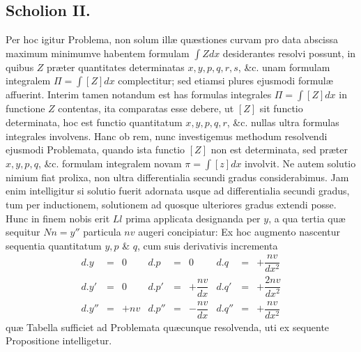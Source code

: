 \subsection*{Scholion II.}
Per hoc igitur Problema, non solum illæ quæstiones curvam pro data abscissa maximum minimumve habentem formulam $\int Zdx$ desiderantes resolvi possunt, in quibus $Z$ præter quantitates determinatas $x,y,p,q,r,s$, \&c. unam formulam integralem $\Pi=\int[Z]dx$ complectitur; sed etiamsi plures ejusmodi formulæ affuerint. Interim tamen notandum est has formulas integrales $\Pi=\int[Z]dx$ in functione $Z$ contentas, ita comparatas esse debere, ut $[Z]$ sit functio determinata, hoc est functio quantitatum $x,y,p,q,r$, \&c. nullas ultra formulas integrales involvens. Hanc ob rem, nunc investigemus methodum resolvendi ejusmodi Problemata, quando ista functio $[Z]$ non est determinata, sed præter $x,y,p,q$, \&c. formulam integralem novam $\pi=\int[z]dx$ involvit. Ne autem solutio nimium fiat prolixa, non ultra differentialia secundi gradus considerabimus. Jam enim intelligitur si solutio fuerit adornata usque ad differentialia secundi gradus, tum per inductionem, solutionem ad quosque ulteriores gradus extendi posse. Hunc in finem nobis erit $Ll$ prima applicata designanda per $y$, a qua tertia quæ sequitur $Nn=y''$ particula $nv$ augeri concipiatur: Ex hoc augmento nascentur sequentia quantitatum $y,p$ \& $q$, cum suis derivativis incrementa
\[\begin{array}{lll|lll|lll}
d.y&=&0&d.p&=&0&d.q&=&+\dfrac{nv}{dx^2}\\[4pt]
d.y'&=&0&d.p'&=&+\dfrac{nv}{dx}&d.q'&=&+\dfrac{2nv}{dx^2}\\[4pt]
d.y''&=&+nv&d.p''&=&-\dfrac{nv}{dx}&d.q''&=&+\dfrac{nv}{dx^2}
\end{array}\]
quæ Tabella sufficiet ad Problemata quæcunque resolvenda, uti ex sequente Propositione intelligetur.
